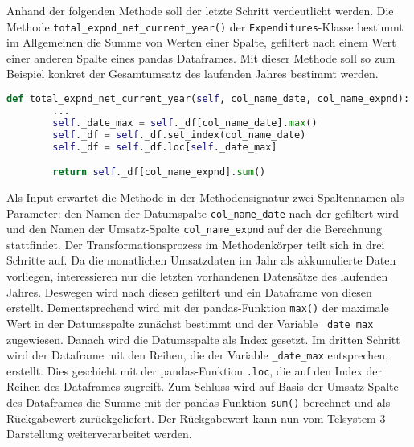     Anhand der folgenden Methode soll der letzte Schritt verdeutlicht werden.
    Die Methode \texttt{total\_expnd\_net\_current\_year()} der \texttt{Expenditures}-Klasse bestimmt im Allgemeinen die Summe von Werten einer Spalte, gefiltert
    nach einem Wert einer anderen Spalte eines pandas Dataframes. Mit dieser Methode soll so zum Beispiel konkret der Gesamtumsatz des 
    laufenden Jahres bestimmt werden.

    \begin{lstlisting}[language=Python, caption=Beispiel Methode Exenditures class]
    def total_expnd_net_current_year(self, col_name_date, col_name_expnd):
        ... 
        self._date_max = self._df[col_name_date].max()
        self._df = self._df.set_index(col_name_date)
        self._df = self._df.loc[self._date_max]

        return self._df[col_name_expnd].sum()  
    \end{lstlisting}

    Als Input erwartet die Methode in der Methodensignatur zwei Spaltennamen als Parameter: den Namen der Datumspalte \texttt{col\_name\_date} nach der gefiltert wird
    und den Namen der Umsatz-Spalte  \texttt{col\_name\_expnd} auf der die Berechnung stattfindet. Der Transformationsprozess im Methodenkörper teilt sich in drei Schritte auf. Da die monatlichen Umsatzdaten im Jahr als 
    akkumulierte Daten vorliegen, interessieren nur die letzten vorhandenen Datensätze des laufenden Jahres. Deswegen
    wird nach diesen gefiltert und ein Dataframe von diesen erstellt. Dementsprechend wird mit der pandas-Funktion \texttt{max()} 
    der maximale Wert in der Datumsspalte zunächst bestimmt und der Variable \texttt{\_date\_max} zugewiesen. Danach wird die Datumsspalte als Index gesetzt. 
    Im dritten Schritt wird der Dataframe mit den Reihen, die der Variable \texttt{\_date\_max} entsprechen, erstellt. Dies geschieht mit der pandas-Funktion \texttt{.loc}, die
    auf den Index der Reihen des Dataframes zugreift. Zum Schluss wird auf Basis der Umsatz-Spalte des Dataframes die Summe mit der pandas-Funktion \texttt{sum()} berechnet 
    und als Rückgabewert zurückgeliefert. Der Rückgabewert kann nun vom Telsystem 3 Darstellung weiterverarbeitet werden.\\


